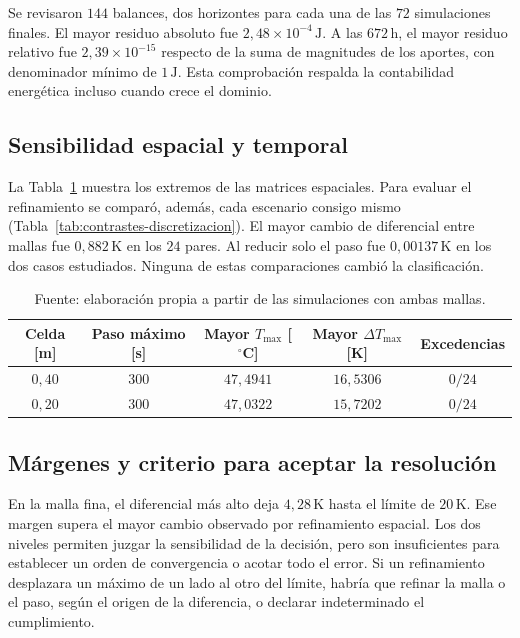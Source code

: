 Se revisaron $144$ balances, dos horizontes para cada una de las $72$ simulaciones finales. El mayor residuo absoluto fue $2{,}48\times10^{-4}\,\mathrm J$. A las $672\,\mathrm h$, el mayor residuo relativo fue $2{,}39\times10^{-15}$ respecto de la suma de magnitudes de los aportes, con denominador mínimo de $1\,\mathrm J$. Esta comprobación respalda la contabilidad energética incluso cuando crece el dominio.

\subsection{Sensibilidad espacial y temporal}
La Tabla~\ref{tab:maximos-verificacion} muestra los extremos de las matrices espaciales. Para evaluar el refinamiento se comparó, además, cada escenario consigo mismo (Tabla~\ref{tab:contrastes-discretizacion}). El mayor cambio de diferencial entre mallas fue $0{,}882\,\mathrm K$ en los $24$ pares. Al reducir solo el paso fue $0{,}00137\,\mathrm K$ en los dos casos estudiados. Ninguna de estas comparaciones cambió la clasificación.
\begin{table}[htbp]
  \centering
  \caption{Máximos del catálogo de la propuesta en las dos mallas}
  \label{tab:maximos-verificacion}
  \small
  \begin{tabular}{ccccc}
    \toprule
    Celda [m] & Paso máximo [s] & Mayor $T_{\max}$ [$^\circ$C] & Mayor $\Delta T_{\max}$ [K] & Excedencias \\
    \midrule
    $0{,}40$ & $300$ & $47{,}4941$ & $16{,}5306$ & $0/24$ \\
    $0{,}20$ & $300$ & $47{,}0322$ & $15{,}7202$ & $0/24$ \\
    \bottomrule
  \end{tabular}
  \captionsetup{skip=2pt}
  \caption*{Fuente: elaboración propia a partir de las simulaciones con ambas mallas.}
\end{table}

\subsection{Márgenes y criterio para aceptar la resolución}
En la malla fina, el diferencial más alto deja $4{,}28\,\mathrm K$ hasta el límite de $20\,\mathrm K$. Ese margen supera el mayor cambio observado por refinamiento espacial. Los dos niveles permiten juzgar la sensibilidad de la decisión, pero son insuficientes para establecer un orden de convergencia o acotar todo el error. Si un refinamiento desplazara un máximo de un lado al otro del límite, habría que refinar la malla o el paso, según el origen de la diferencia, o declarar indeterminado el cumplimiento.

